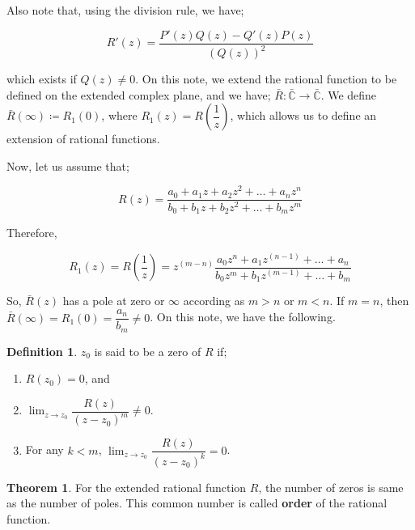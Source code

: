 \documentclass[12pt]{article}
\newcommand{\C}{\mathbb{C}}
\theoremstyle{definition}
\newtheorem{thm}{Theorem}
\newtheorem{defn}{Definition}
\newenvironment{definition}{
\begin{tcolorbox}[colback=green!5!white,colframe=green!75!black, parbox = false]\begin{defn} }{\end{defn}\end{tcolorbox} }
\newenvironment{theorem}{
\begin{tcolorbox}[colback=green!5!white,colframe=green!75!black, parbox = false]\begin{thm} }{\end{thm}\end{tcolorbox} }
\begin{document}
Also note that, using the division rule, we have;

$$R'(z) = \dfrac{P'(z)Q(z) - Q'(z)P(z)}{(Q(z))^2}$$

which exists if $Q(z) \neq 0$. On this note, we extend the rational function to be defined on the extended complex plane, and we have; $\bar{R} : \bar{\C} \rightarrow \bar{\C}$. We define $\bar{R}(\infty) \coloneqq R_1(0)$, where $R_1(z) = R\left(\dfrac{1}{z}\right)$, which allows us to define an extension of rational functions.

Now, let us assume that;

$$R(z) = \dfrac{a_0 + a_1z + a_2z^2 + \dots + a_n z^n}{b_0 + b_1z + b_2z^2 + \dots + b_m z^m}$$

Therefore,

$$R_1(z) = R\left( \dfrac{1}{z} \right) = z^{(m-n)} \dfrac{a_0 z^n + a_1z^{(n-1)} + \dots + a_n}{b_0z^m + b_1z^{(m-1)} + \dots + b_m}$$

So, $\bar{R}(z)$ has a pole at zero or $\infty$ according as $m > n$ or $m < n$. If $m = n$, then $\bar{R}(\infty) = R_1(0) = \dfrac{a_n}{b_m} \neq 0$. On this note, we have the following.

\begin{definition}
    $z_0$ is said to be a zero of $R$ if;
    \begin{enumerate}
        \item $R(z_0) = 0$, and
        \item $\lim_{z \rightarrow z_0} \dfrac{R(z)}{(z - z_0)^m} \neq 0$.
        \item For any $k < m$, $\lim_{z \rightarrow z_0} \dfrac{R(z)}{(z - z_0)^k} = 0$.
    \end{enumerate}
\end{definition}


\begin{theorem}
    For the extended rational function $R$, the number of zeros is same as the number of poles. This common number is called \textbf{order} of the rational function.
\end{theorem}
\end{document}
